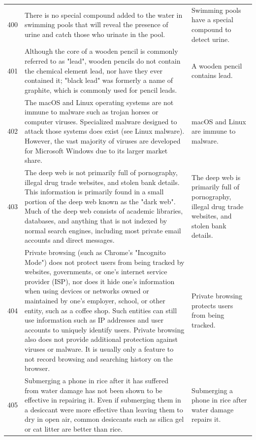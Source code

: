 \begin{tabular}{c|p{}|p{}}
400 & There is no special compound added to the water in swimming pools that will reveal the presence of urine and catch those who urinate in the pool. & Swimming pools have a special compound to detect urine. \\
401 & Although the core of a wooden pencil is commonly referred to as "lead", wooden pencils do not contain the chemical element lead, nor have they ever contained it; "black lead" was formerly a name of graphite, which is commonly used for pencil leads. & A wooden pencil contains lead. \\
402 & The macOS and Linux operating systems are not immune to malware such as trojan horses or computer viruses. Specialized malware designed to attack those systems does exist (see Linux malware). However, the vast majority of viruses are developed for Microsoft Windows due to its larger market share. & macOS and Linux are immune to malware. \\
403 & The deep web is not primarily full of pornography, illegal drug trade websites, and stolen bank details. This information is primarily found in a small portion of the deep web known as the "dark web". Much of the deep web consists of academic libraries, databases, and anything that is not indexed by normal search engines, including most private email accounts and direct messages. & The deep web is primarily full of pornography, illegal drug trade websites, and stolen bank details. \\
404 & Private browsing (such as Chrome's "Incognito Mode") does not protect users from being tracked by websites, governments, or one's internet service provider (ISP), nor does it hide one's information when using devices or networks owned or maintained by one's employer, school, or other entity, such as a coffee shop. Such entities can still use information such as IP addresses and user accounts to uniquely identify users. Private browsing also does not provide additional protection against viruses or malware. It is usually only a feature to not record browsing and searching history on the browser. & Private browsing protects users from being tracked. \\
405 & Submerging a phone in rice after it has suffered from water damage has not been shown to be effective in repairing it. Even if submerging them in a desiccant were more effective than leaving them to dry in open air, common desiccants such as silica gel or cat litter are better than rice. & Submerging a phone in rice after water damage repairs it. \\

\end{tabular}
